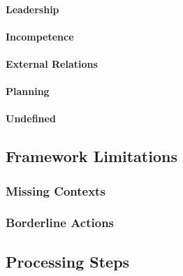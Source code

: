 \paragraph{Leadership}
\paragraph{Incompetence}
\paragraph{External Relations}
\paragraph{Planning}
\paragraph{Undefined}
\subsection{Framework Limitations}
\subsubsection{Missing Contexts}
\subsubsection{Borderline Actions}
\subsection{Processing Steps}
